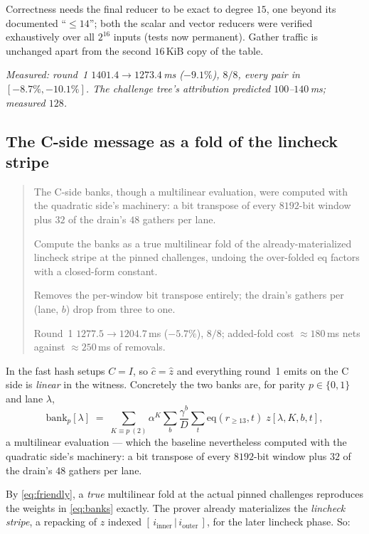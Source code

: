 \documentclass[11pt]{article}
\newcommand{\eq}{\mathrm{eq}}
\newenvironment{optsummary}{%
  \begin{quote}\small
  \begin{description}
  \setlength{\itemsep}{1pt}\setlength{\parsep}{0pt}\setlength{\topsep}{2pt}
}{%
  \end{description}
  \end{quote}
}
\begin{document}
Correctness needs the final reducer to be exact to degree $15$, one beyond its
documented ``$\le14$''; both the scalar and vector reducers were verified
exhaustively over all $2^{16}$ inputs (tests now permanent). Gather traffic is
unchanged apart from the second $16\,$KiB copy of the table.

\emph{Measured: round~1 $1401.4\to1273.4\,$ms ($-9.1\%$), $8/8$, every pair in
$[-8.7\%,-10.1\%]$. The challenge tree's attribution predicted
$100$--$140\,$ms; measured $128$.}

\subsection{The C-side message as a fold of the lincheck stripe}
\label{sec:stripe}

\begin{optsummary}
\item[Baseline:] The C-side banks, though a multilinear evaluation, were computed with the quadratic side's machinery: a bit transpose of every $8192$-bit window plus $32$ of the drain's $48$ gathers per lane.
\item[Improvement:] Compute the banks as a true multilinear fold of the already-materialized lincheck stripe at the pinned challenges, undoing the over-folded eq factors with a closed-form constant.
\item[Mechanism:] Removes the per-window bit transpose entirely; the drain's gathers per (lane, $b$) drop from three to one.
\item[Result:] Round~1 $1277.5\to1204.7\,$ms ($-5.7\%$), $8/8$; added-fold cost $\approx180\,$ms nets against $\approx250\,$ms of removals.
\end{optsummary}

In the fast hash setups $C=I$, so $\hat c = \hat z$ and everything round~1
emits on the C side is \emph{linear} in the witness. Concretely the two banks
are, for parity $p\in\{0,1\}$ and lane $\lambda$,
\begin{equation}
\mathrm{bank}_p[\lambda] \;=\;
\sum_{K\equiv p\ (2)} \alpha^{K}
\sum_{b} \frac{\gamma^{b}}{D}
\sum_{t} \eq(r_{\ge13}, t)\; z[\lambda,K,b,t],
\label{eq:banks}
\end{equation}
a multilinear evaluation --- which the baseline nevertheless computed with the
quadratic side's machinery: a bit transpose of every $8192$-bit window plus
$32$ of the drain's $48$ gathers per lane.

By \eqref{eq:friendly}, a \emph{true} multilinear fold at the actual pinned
challenges reproduces the weights in \eqref{eq:banks} exactly. The prover
already materializes the \emph{lincheck stripe}, a repacking of $z$ indexed
$[\,i_{\mathrm{inner}}\,|\,i_{\mathrm{outer}}\,]$, for the later lincheck
phase. So:
\end{document}

